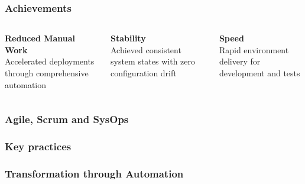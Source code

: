 \documentclass{beamer}
\begin{document}
\begin{frame}
\frametitle{Achievements}

\begin{columns}[T,onlytextwidth]
    
    \begin{tcolorbox}[colframe=soleneBlue!30, colback=white, boxrule=0.4pt, arc=1mm, left=1mm, right=1mm, top=0.5mm, bottom=0.5mm]
        \centering
        \textbf{Reduced Manual Work} \\
        \vspace{0.5em}
        \footnotesize Accelerated deployments through comprehensive automation
    \end{tcolorbox}
    
    \begin{tcolorbox}[colframe=soleneBlue!30, colback=white, boxrule=0.4pt, arc=1mm, left=1mm, right=1mm, top=0.5mm, bottom=0.5mm]
        \centering
        \textbf{Stability} \\
        \vspace{0.5em}
        \footnotesize Achieved consistent system states with zero configuration drift
    \end{tcolorbox}
    
    \begin{tcolorbox}[colframe=soleneBlue!30, colback=white, boxrule=0.4pt, arc=1mm, left=1mm, right=1mm, top=0.5mm, bottom=0.5mm]
        \centering
        \textbf{Speed} \\
        \vspace{0.5em}
        \footnotesize Rapid environment delivery for development and tests
    \end{tcolorbox}

\end{columns}

\end{frame}


\begin{frame}
\frametitle{Agile, Scrum and SysOps}
\end{frame}

\begin{frame}
\frametitle{Key practices}
\end{frame}

\begin{frame}
\frametitle{Transformation through Automation}
\end{frame}
\end{document}
